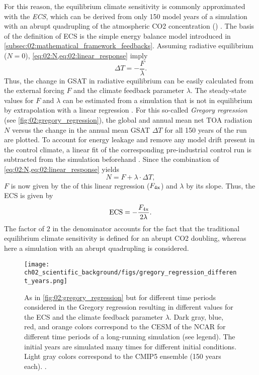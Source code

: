 For this reason, the equilibrium climate sensitivity is commonly approximated
with the \emph{\acf{ECS}}, which can be derived from only 150 model years of a
simulation with an abrupt quadrupling of the atmospheric \ac{CO2} concentration
() \autocite{Gregory2004}. The basis of the definition of \ac{ECS}
is the simple energy balance model introduced in
\cref{subsec:02:mathematical_framework_feedbacks}. Assuming radiative
equilibrium ($N = 0$), \cref{eq:02:N,eq:02:linear_response} imply
\begin{equation}
  \Delta T = -\frac{F}{\lambda}.
  \label{eq:02:delta_t_eq}
\end{equation} Thus, the change in \ac{GSAT} in radiative equilibrium can be
easily calculated from the external forcing $F$ and the climate feedback
parameter $\lambda$. The steady-state values for $F$ and $\lambda$ can be
estimated from a  simulation that is not in equilibrium by
extrapolation with a linear regression \autocite{Gregory2004}. For this
so-called \emph{Gregory regression} (see \cref{fig:02:gregory_regression}), the
global and annual mean net \ac{TOA} radiation $N$ versus the change in the
annual mean \ac{GSAT} $\Delta T$ for all 150 years of the  run are
plotted. To account for energy leakage and remove any model drift present in
the control climate, a linear fit of the corresponding pre-industrial control
run is subtracted from the  simulation beforehand
\autocite{Andrews2012}. Since the combination of
\cref{eq:02:N,eq:02:linear_response} yields
\begin{equation}
  N = F + \lambda \cdot \Delta T,
  \label{eq:02:N_vs_delta_t}
\end{equation}
$F$ is now given by the \yintercept{} of this linear regression
($F_{\textnormal{4x}}$) and $\lambda$ by its slope. Thus, the \ac{ECS} is given by
\begin{equation}
  \textnormal{ECS} = -\frac{F_{\textnormal{4x}}}{2 \lambda}.
  \label{eq:02:ecs}
\end{equation}
The factor of $2$ in the denominator accounts for the fact that the traditional
equilibrium climate sensitivity is defined for an abrupt \ac{CO2} doubling,
whereas here a simulation with an abrupt quadrupling is considered.

\begin{figure}[t]
  \centering
  \texttt{[image: 
    ch02\_scientific\_background/figs/gregory\_regression\_different\_years.png]}
  \caption[
  Gregory regression for different time periods.
  ]{
    As in \cref{fig:02:gregory_regression} but for different time periods
    considered in the Gregory regression resulting in different values for the
    \acf{ECS} and the climate feedback parameter $\lambda$. Dark gray, blue,
    red, and orange colors correspond to the \acf{CESM} of the \acf{NCAR} for
    different time periods of a long-running simulation (see legend). The
    initial years are simulated many times for different initial conditions.
    Light gray colors correspond to the \acs{CMIP}5 ensemble (150 years each).
    .
  }
  \label{fig:02:gregory_regression_different_years}
\end{figure}

